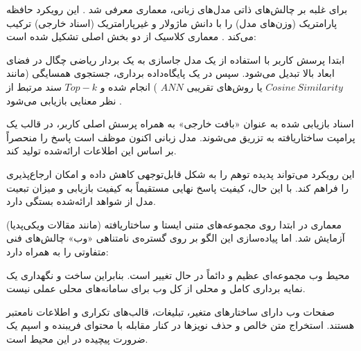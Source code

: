 

برای غلبه بر چالش‌های ذاتی مدل‌های زبانی، معماری  معرفی شد \cite{lewis2020rag}. این رویکرد حافظه پارامتریک (وزن‌های مدل) را با دانش ماژولار و غیرپارامتریک (اسناد خارجی) ترکیب می‌کند \cite{guu2020realm}. معماری کلاسیک  از دو بخش اصلی تشکیل شده است:


  ابتدا پرسش کاربر با استفاده از یک مدل جاسازی به یک بردار ریاضی چگال در فضای ابعاد بالا تبدیل می‌شود. سپس در یک پایگاه‌داده برداری، جستجوی همسایگی (مانند $Cosine \ Similarity$ یا روش‌های تقریبی $ANN$ \cite{johnson2019billion}) انجام شده و $Top-k$ سند مرتبط از نظر معنایی بازیابی می‌شود \cite{karpukhin2020dpr}.

  اسناد بازیابی شده به عنوان «بافت خارجی» به همراه پرسش اصلی کاربر، در قالب یک پرامپت ساختاریافته به  تزریق می‌شوند. مدل زبانی اکنون موظف است پاسخ را منحصراً بر اساس این اطلاعات ارائه‌شده تولید کند.


این رویکرد می‌تواند پدیده توهم را به شکل قابل‌توجهی کاهش داده و امکان ارجاع‌پذیری را فراهم کند. با این حال، کیفیت پاسخ نهایی مستقیماً به کیفیت بازیابی و میزان تبعیت مدل از شواهد ارائه‌شده بستگی دارد.


معماری  در ابتدا روی مجموعه‌های متنی ایستا و ساختاریافته (مانند مقالات ویکی‌پدیا) آزمایش شد. اما پیاده‌سازی این الگو بر روی گستره‌ی نامتناهی «وب» چالش‌های فنی متفاوتی را به همراه دارد:


  محیط وب مجموعه‌ای عظیم و دائماً در حال تغییر است. بنابراین ساخت و نگهداری یک نمایه برداری کامل و محلی از کل وب برای سامانه‌های محلی عملی نیست.

  صفحات وب دارای ساختارهای متغیر، تبلیغات، قالب‌های تکراری و اطلاعات نامعتبر هستند. استخراج متن خالص و حذف نویزها \cite{kohlschutter2010boilerplate} در کنار مقابله با محتوای فریبنده و اسپم \cite{castillo2010adversarial} یک ضرورت پیچیده در این محیط است.

